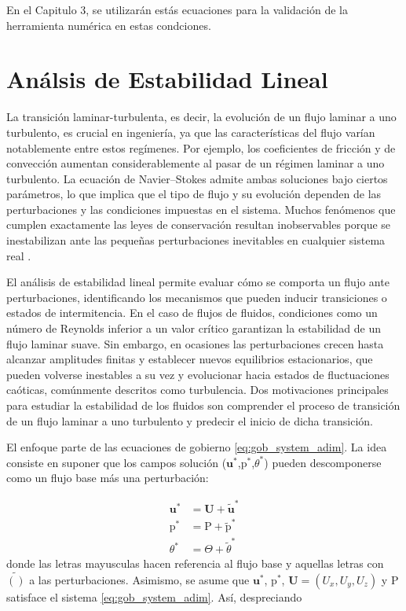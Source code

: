En el Capitulo 3, se utilizarán estás ecuaciones para la validación de la herramienta numérica en estas condciones. 

\section{Análsis de Estabilidad Lineal}

La transición laminar-turbulenta, es decir, la evolución de un flujo laminar a uno turbulento, es crucial en ingeniería, ya que las características del flujo varían notablemente entre estos regímenes. Por ejemplo, los coeficientes de fricción y de convección aumentan considerablemente al pasar de un régimen laminar a uno turbulento. La ecuación de Navier–Stokes admite ambas soluciones bajo ciertos parámetros, lo que implica que el tipo de flujo y su evolución dependen de las perturbaciones y las condiciones impuestas en el sistema. Muchos fenómenos que cumplen exactamente las leyes de conservación resultan inobservables porque se inestabilizan ante las pequeñas perturbaciones inevitables en cualquier sistema real \cite{kundu}.

El análisis de estabilidad lineal permite evaluar cómo se comporta un flujo ante perturbaciones, identificando los mecanismos que pueden inducir transiciones o estados de intermitencia. En el caso de flujos de fluidos, condiciones como un número de Reynolds inferior a un valor crítico garantizan la estabilidad de un flujo laminar suave. Sin embargo, en ocasiones las perturbaciones crecen hasta alcanzar amplitudes finitas y establecer nuevos equilibrios estacionarios, que pueden volverse inestables a su vez y evolucionar hacia estados de fluctuaciones caóticas, comúnmente descritos como turbulencia. Dos motivaciones principales para estudiar la estabilidad de los fluidos son comprender el proceso de transición de un flujo laminar a uno turbulento y predecir el inicio de dicha transición.

El enfoque parte de las ecuaciones de gobierno \ref{eq:gob_system_adim}. La idea consiste en suponer que los campos solución ($\mathbf{u^*}$,$\text{p}^*$,$\theta^*$) pueden descomponerse como un flujo base más una perturbación:


\begin{align}
\mathbf{u^*} &= \mathbf{U} + \tilde{\mathbf{u}}^* \\
\text{p}^* &= \text{P}+ \tilde{\text{p}}^* \\
\theta^* &= \Theta + \tilde{\theta}^*
\end{align}  
donde las letras mayusculas hacen referencia al flujo base y aquellas letras con $\tilde{()}$ a las perturbaciones. Asimismo, se asume que $\mathbf{u^*}$, $\text{p}^*$, $\mathbf{U} = (U_x,U_y,U_z)$ y $\text{P}$ satisface el sistema \ref{eq:gob_system_adim}. Así, despreciando

\\